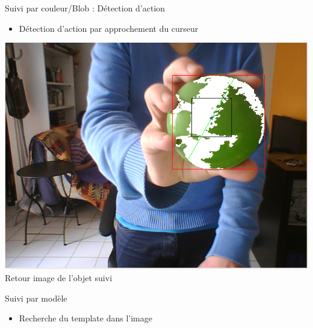 \documentclass{beamer}
\begin{document}
            \begin{frame}{Suivi par couleur/Blob : Détection d'action}
                  \begin{itemize}
                        \item{Détection d'action par approchement du curseur}
                  \end{itemize}
                  \begin{center}
                        \includegraphics[scale=0.25]{Capture3.png}\\
                        Retour image de l'objet suivi
                  \end{center}
            \end{frame}
            
            \begin{frame}{Suivi par modèle}
                  \begin{itemize}
                        \item{Recherche du template dans l'image}
                  \end{itemize}
            \end{frame}
            
\end{document}
